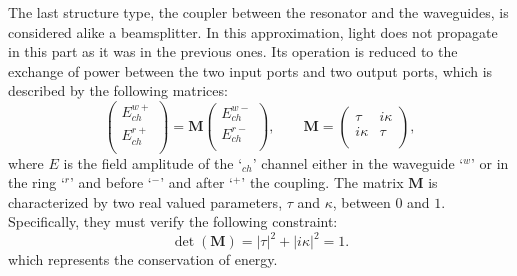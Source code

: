 The last structure type, the coupler between the resonator and the waveguides, is considered alike a beamsplitter.
In this approximation, light does not propagate in this part as it was in the previous ones.
Its operation is reduced to the exchange of power between the two input ports and two output ports, which is described by the following matrices:
\begin{equation}
\begin{pmatrix}
E^{w+}_{ch} \\
E^{r+}_{ch} \\
\end{pmatrix} = \textbf{M}
\begin{pmatrix}
E^{w-}_{ch} \\
E^{r-}_{ch} \\
\end{pmatrix}, \qquad \textbf{M} = 
\begin{pmatrix}
\tau & i\kappa \\
i\kappa & \tau \\
\end{pmatrix},
\end{equation}
where $E$ is the field amplitude of the `$_{ch}$' channel either in the waveguide `$^w$' or in the ring `$^r$' and before `$^-$' and after `$^+$' the coupling.
The matrix $\textbf{M}$ is characterized by two real valued parameters, $\tau$ and $\kappa$, between $0$ and $1$.
Specifically, they must verify the following constraint:
\begin{equation}
\det\left(\textbf{M}\right) = |\tau|^2 + |i\kappa|^2 = 1.
\end{equation}
which represents the conservation of energy.

